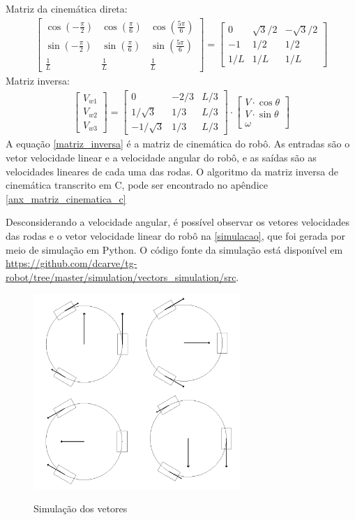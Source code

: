 Matriz da cinemática direta:
\begin{gather}
	\begin{bmatrix}
		\cos{\left(-\frac{\pi}{2}\right)} & \cos{\left(\frac{\pi}{6}\right)} & \cos{\left(\frac{5\pi}{6}\right)} \\
		\sin{\left(-\frac{\pi}{2}\right)} & \sin{\left(\frac{\pi}{6}\right)} & \sin{\left(\frac{5\pi}{6}\right)} \\
		\frac{1}{L} & \frac{1}{L} & \frac{1}{L}
	\end{bmatrix}
	=
	\begin{bmatrix}
		0 & \sqrt{3}/2 & -\sqrt{3}/2 \\
		-1 & 1/2 & 1/2  \\
		1/L & 1/L & 1/L
	\end{bmatrix}
\end{gather}
Matriz inversa:
\begin{gather}
	\label{matriz_inversa}
	\begin{bmatrix} V_{w1} \\  V_{w2} \\  V_{w3} \end{bmatrix}
	=
	\begin{bmatrix}
		0 & -2/3 & L/3 \\
		1/\sqrt{3} & 1/3 & L/3\\
		-1/\sqrt{3} & 1/3 & L/3
	\end{bmatrix}
	\cdot
	\begin{bmatrix} V\cdot \cos{\theta} \\  V\cdot \sin{\theta} \\  \omega \end{bmatrix}
\end{gather}
A equação \eqref{matriz_inversa} é a matriz de cinemática do robô.
As entradas são o vetor velocidade linear e a velocidade angular do robô, e as
saídas são as velocidades lineares de cada uma das rodas.
O algoritmo da matriz inversa de cinemática transcrito em C, pode ser encontrado no apêndice \ref{anx_matriz_cinematica_c}

Desconsiderando a velocidade angular, é possível observar os vetores velocidades
das rodas e o vetor velocidade linear do robô na \autoref{simulacao}, que
foi gerada por meio de simulação em Python. O código fonte da simulação está
disponível em \url{https://github.com/dcarve/tg-robot/tree/master/simulation/vectors_simulation/src}.

\begin{figure}[ht]
	\centering
	\caption{Simulação dos vetores}
	\includegraphics[width=0.7\textwidth]{figures/simulacao}
	\label{simulacao}
\end{figure}

